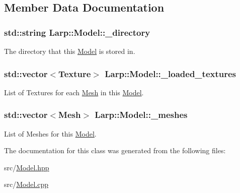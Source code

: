 \subsection{Member Data Documentation}
\hypertarget{classLarp_1_1Model_a568e7aeee510320b2378a0fc57c5c7c5}{
\subsubsection[{\-\_\-directory}]{\setlength{\rightskip}{0pt plus 5cm}std\-::string Larp\-::\-Model\-::\-\_\-directory\hspace{0.3cm}{\ttfamily [private]}}}\label{classLarp_1_1Model_a568e7aeee510320b2378a0fc57c5c7c5}
The directory that this \hyperlink{classLarp_1_1Model}{Model} is stored in. \hypertarget{classLarp_1_1Model_ac5e40faa76039650ae6b32828b8681f9}{
\subsubsection[{\-\_\-loaded\-\_\-textures}]{\setlength{\rightskip}{0pt plus 5cm}std\-::vector$<${\bf Texture}$>$ Larp\-::\-Model\-::\-\_\-loaded\-\_\-textures\hspace{0.3cm}{\ttfamily [private]}}}\label{classLarp_1_1Model_ac5e40faa76039650ae6b32828b8681f9}
List of Textures for each \hyperlink{classLarp_1_1Mesh}{Mesh} in this \hyperlink{classLarp_1_1Model}{Model}. \hypertarget{classLarp_1_1Model_ae75758feb59857f6b907bbfa0cf993f2}{
\subsubsection[{\-\_\-meshes}]{\setlength{\rightskip}{0pt plus 5cm}std\-::vector$<${\bf Mesh}$>$ Larp\-::\-Model\-::\-\_\-meshes\hspace{0.3cm}{\ttfamily [private]}}}\label{classLarp_1_1Model_ae75758feb59857f6b907bbfa0cf993f2}
List of Meshes for this \hyperlink{classLarp_1_1Model}{Model}. 

The documentation for this class was generated from the following files\-:\begin{DoxyCompactItemize}
\item 
src/\hyperlink{Model_8hpp}{Model.\-hpp}\item 
src/\hyperlink{Model_8cpp}{Model.\-cpp}\end{DoxyCompactItemize}
